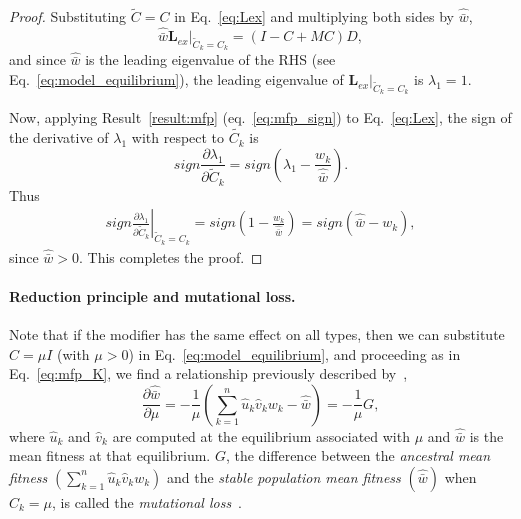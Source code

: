 \documentclass[9pt, a4paper, twocolumn]{extarticle}
\newcommand{\cl}{\mathbf{L}}
\begin{document}
\begin{proof}
Substituting $\tilde{C}=C$ in Eq.~\ref{eq:Lex} and multiplying both sides by $\hat{\bar w}$,
\begin{equation}
\hat{\bar w} \cl_{ex}\big\rvert_{\tilde{C}_k = C_k} = (I-C+MC) D,
\end{equation}
and since $\hat{\bar w}$ is the leading eigenvalue of the RHS (see Eq.~\ref{eq:model_equilibrium}),
the leading eigenvalue of $\cl_{ex}\big\rvert_{\tilde{C}_k = C_k}$ is $\lambda_1=1$.

Now, applying Result~\ref{result:mfp} (eq.~\ref{eq:mfp_sign}) to Eq.~\ref{eq:Lex}, the sign of the derivative of $\lambda_1$ with respect to $\tilde{C_k}$ is
\begin{equation}
sign \frac{\partial \lambda_1}{\partial \tilde{C}_k} =
sign\left(\lambda_1 - \frac{w_k}{\hat{\bar w}}\right).
\end{equation}
Thus
\begin{multline}
sign \left.\frac{\partial \lambda_1}{\partial \tilde{C}_k}\right\rvert_{\tilde{C}_k = C_k} = 
sign\left(1 - \frac{w_k}{\hat{\bar w}}\right) =  
sign(\hat{\bar w} - w_k),
\end{multline}
since $\hat{\bar w}>0$.
This completes the proof.
\end{proof}

\paragraph*{Reduction principle and mutational loss.}

Note that if the modifier has the same effect on all types,
then we can substitute $C = \mu I$ (with $\mu > 0$) in Eq.~\ref{eq:model_equilibrium}, and proceeding as in Eq.~\ref{eq:mfp_K}, we find a relationship previously described by~\citet[eq.~24]{Hermisson2002},
\begin{equation}\label{eq:mutational_loss}
\frac{\partial \hat{\bar{w}}}{\partial \mu} = 
-\frac{1}{\mu}\left(\sum_{k=1}^{n} \hat u_k \hat v_k w_k - \hat{\bar{w}} \right) = -\frac{1}{\mu} G,
\end{equation}
where $\hat u_k$ and $\hat v_k$ are computed at the equilibrium associated with $\mu$ and $\hat{\bar{w}}$ is the mean fitness at that equilibrium.
$G$, the difference between the \emph{ancestral mean fitness} $(\sum_{k=1}^{n} \hat u_k \hat v_k w_k)$ and the \emph{stable population mean fitness} $(\hat{\bar{w}})$ when $C_k=\mu$, is  called the \emph{mutational loss}~\citep{Hermisson2002}.
\end{document}
